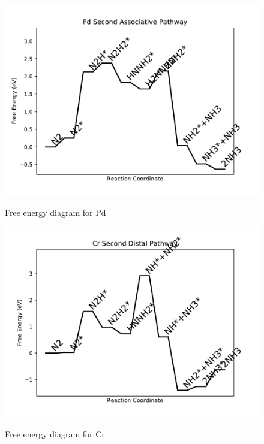 \documentclass{article}
\begin{document}
\begin{figure}
\includegraphics[width=1\linewidth]{data/plots/Pd_associative_2.pdf}
\label{fig:Pd_associative_2}
\caption{Free energy diagram for Pd}
\end{figure}

\clearpage
\begin{figure}
\includegraphics[width=1\linewidth]{data/plots/Cr_distal_2.pdf}
\label{fig:Cr_distal_2}
\caption{Free energy diagram for Cr}
\end{figure}
\end{document}

